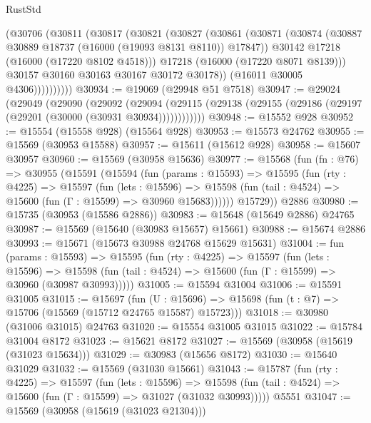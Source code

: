 \begin{lexlean}{RustStd}
\begin{coremodule}
                (@30706
                  (@30811
                    (@30817
                      (@30821
                        (@30827
                          (@30861
                            (@30871
                              (@30874 (@30887 @30889 @18737 (@16000 (@19093 @8131 @8110)) @17847))
                              @30142
                              @17218
                              (@16000 (@17220 @8102 @4518)))
                            @17218
                            (@16000 (@17220 @8071 @8139)))
                          @30157
                          @30160
                          @30163
                          @30167
                          @30172
                          @30178))
                      (@16011 @30005 @4306))))))))))
@30934 := @19069 (@29948 @51 @7518)
@30947 := @29024
    (@29049
      (@29090
        (@29092
          (@29094 (@29115 (@29138 (@29155 (@29186 (@29197 (@29201 (@30000 (@30931 @30934))))))))))))
@30948 := @15552 @928
@30952 := @15554 (@15558 @928) (@15564 @928)
@30953 := @15573 @24762
@30955 := @15569 (@30953 @15588)
@30957 := @15611 (@15612 @928)
@30958 := @15607 @30957
@30960 := @15569 (@30958 @15636)
@30977 := @15568
    (fun (fn : @76) =>
    @30955
      (@15591
        (@15594
          (fun (params : @15593) =>
          @15595
            (fun (rty : @4225) =>
            @15597
              (fun (lets : @15596) =>
              @15598 (fun (tail : @4524) => @15600 (fun (Γ : @15599) => @30960 @15683))))))
        @15729))
    @2886
@30980 := @15735 (@30953 (@15586 @2886))
@30983 := @15648 (@15649 @2886) @24765
@30987 := @15569 (@15640 (@30983 @15657) @15661)
@30988 := @15674 @2886
@30993 := @15671 (@15673 @30988 @24768 @15629 @15631)
@31004 := fun (params : @15593) =>
  @15595
    (fun (rty : @4225) =>
    @15597
      (fun (lets : @15596) =>
      @15598 (fun (tail : @4524) => @15600 (fun (Γ : @15599) => @30960 (@30987 @30993)))))
@31005 := @15594 @31004
@31006 := @15591 @31005
@31015 := @15697
    (fun (U : @15696) => @15698 (fun (t : @7) => @15706 (@15569 (@15712 @24765 @15587) @15723)))
@31018 := @30980 (@31006 @31015) @24763
@31020 := @15554 @31005 @31015
@31022 := @15784 @31004 @8172
@31023 := @15621 @8172
@31027 := @15569 (@30958 (@15619 (@31023 @15634)))
@31029 := @30983 (@15656 @8172)
@31030 := @15640 @31029
@31032 := @15569 (@31030 @15661)
@31043 := @15787
    (fun (rty : @4225) =>
    @15597
      (fun (lets : @15596) =>
      @15598 (fun (tail : @4524) => @15600 (fun (Γ : @15599) => @31027 (@31032 @30993)))))
    @5551
@31047 := @15569 (@30958 (@15619 (@31023 @21304)))

\end{coremodule}
\end{lexlean}
